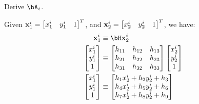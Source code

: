 \newpage
\begin{problem}
  Derive $\bA_i$.

  \begin{answer}
    Given $\mathbf{x}_1^i = \begin{bmatrix} x_1^i & y_1^i & 1 \end{bmatrix}^T$,
    and $\mathbf{x}_2^i = \begin{bmatrix} x_2^i & y_2^i & 1 \end{bmatrix}^T$, we have:
    \begin{align*}
      \bx_1^i &\equiv \bH \bx_2^i \\
      \begin{bmatrix} x_1^i \\ y_1^i \\ 1 \end{bmatrix} & \equiv
        \begin{bmatrix}
          h_{11} & h_{12} & h_{13} \\ 
          h_{21} & h_{22} & h_{23} \\
          h_{31} & h_{32} & h_{33}
        \end{bmatrix}
        \begin{bmatrix}
          x_2^i \\ y_2^i \\ 1
        \end{bmatrix} \\
      \begin{bmatrix} x_1^i \\ y_1^i \\ 1 \end{bmatrix} & \equiv
        \begin{bmatrix}
          h_{1} x_2^i + h_{2} y_2^i + h_{3} \\
          h_{4} x_2^i + h_{5} y_2^i + h_{6} \\
          h_{7} x_2^i + h_{8} y_2^i + h_{9}
        \end{bmatrix}
      \end{align*}


\end{answer}
\end{problem}
